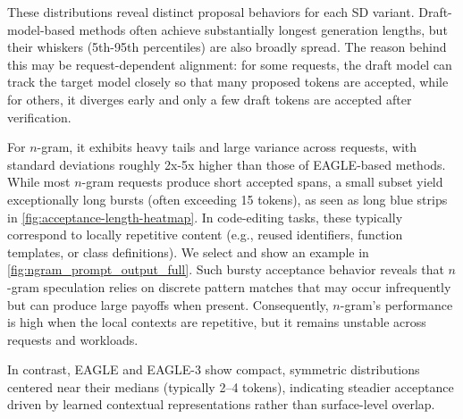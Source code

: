 \documentclass{article}
\newcommand{\jerry}[1]{\textcolor{cyan}{Jerry: #1}}
\begin{document}

These distributions reveal distinct proposal behaviors for each SD variant. Draft-model-based methods often achieve substantially longest generation lengths, but their whiskers (5th-95th percentiles) are also broadly spread. 
The reason behind this may be request-dependent alignment: for some requests, the draft model can track the target model closely so that many proposed tokens are accepted, while for others, it diverges early and only a few draft tokens are accepted after verification.

For $n$-gram, it exhibits heavy tails and large variance across requests, with standard deviations roughly 2x-5x higher than those of EAGLE-based methods. 
While most $n$-gram requests produce short accepted spans, a small subset yield exceptionally long bursts (often exceeding 15 tokens), as seen as long blue strips in \autoref{fig:acceptance-length-heatmap}. 
In code-editing tasks, these typically correspond to locally repetitive content (e.g., reused identifiers, function templates, or class definitions). We select and show an example in \autoref{fig:ngram_prompt_output_full}. Such bursty acceptance behavior reveals that $n$-gram speculation relies on discrete pattern matches that may occur infrequently but can produce large payoffs when present. Consequently, $n$-gram's performance is high when the local contexts are repetitive, but it remains unstable across requests and workloads.


In contrast, EAGLE and EAGLE-3 show compact, symmetric distributions centered near their medians (typically 2–4 tokens), indicating steadier acceptance driven by learned contextual representations rather than surface-level overlap.
\end{document}
